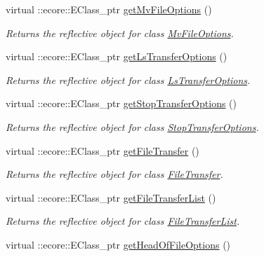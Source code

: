 \begin{DoxyCompactItemize}
virtual ::ecore::EClass\_\-ptr \hyperlink{classFMS__Data_1_1FMS__DataPackage_a9361e4d5dd02ebd28b921d7773d7dc03}{getMvFileOptions} ()
\begin{DoxyCompactList}\small\item\em Returns the reflective object for class \hyperlink{classFMS__Data_1_1MvFileOptions}{MvFileOptions}. \item\end{DoxyCompactList}\item 
virtual ::ecore::EClass\_\-ptr \hyperlink{classFMS__Data_1_1FMS__DataPackage_ad6b45866f27b15d4c8c1de0e3bf288c0}{getLsTransferOptions} ()
\begin{DoxyCompactList}\small\item\em Returns the reflective object for class \hyperlink{classFMS__Data_1_1LsTransferOptions}{LsTransferOptions}. \item\end{DoxyCompactList}\item 
virtual ::ecore::EClass\_\-ptr \hyperlink{classFMS__Data_1_1FMS__DataPackage_a9b593bf061a942f70a3bd39fb2736d70}{getStopTransferOptions} ()
\begin{DoxyCompactList}\small\item\em Returns the reflective object for class \hyperlink{classFMS__Data_1_1StopTransferOptions}{StopTransferOptions}. \item\end{DoxyCompactList}\item 
virtual ::ecore::EClass\_\-ptr \hyperlink{classFMS__Data_1_1FMS__DataPackage_ae411bc92ef0bca1a100bad3e55f003e3}{getFileTransfer} ()
\begin{DoxyCompactList}\small\item\em Returns the reflective object for class \hyperlink{classFMS__Data_1_1FileTransfer}{FileTransfer}. \item\end{DoxyCompactList}\item 
virtual ::ecore::EClass\_\-ptr \hyperlink{classFMS__Data_1_1FMS__DataPackage_ade8687eb75fd97fe8e88a7720401df5a}{getFileTransferList} ()
\begin{DoxyCompactList}\small\item\em Returns the reflective object for class \hyperlink{classFMS__Data_1_1FileTransferList}{FileTransferList}. \item\end{DoxyCompactList}\item 
virtual ::ecore::EClass\_\-ptr \hyperlink{classFMS__Data_1_1FMS__DataPackage_af830243ba68a48074a0a0da93fb55b4f}{getHeadOfFileOptions} ()

\end{DoxyCompactItemize}
